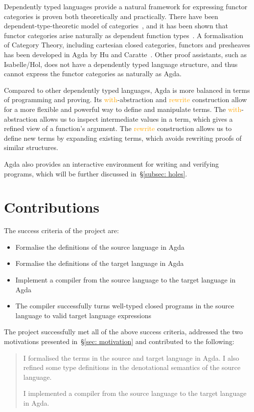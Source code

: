 \documentclass[12pt,a4paper]{report}
\theoremstyle{definition}
\newcounter{motivation}
\newcommand{\secref}[1]{\S\ref{#1}}
\newcommand{\og}[1]{\textcolor{orange}{#1}}
\begin{document}
        Dependently typed languages provide a natural framework for expressing functor categories is proven both theoretically and practically. There have been dependent-type-theoretic model of categories~\autocite{Dybjer}, and it has been shown that functor categories arise naturally as dependent function types~\autocite{Jacobs}. A formalisation of Category Theory, including cartesian closed categories, functors and presheaves has been developed in Agda by Hu and Caratte~\autocite{Cat_Agda}. Other proof assistants, such as Isabelle/Hol, does not have a dependently typed language structure, and thus cannot express the functor categories as naturally as Agda. 

        Compared to other dependently typed languages, Agda is more balanced in terms of programming and proving. Its \og{\textsf{with}}-abstraction and \og{\textsf{rewrite}} construction allow for a more flexible and powerful way to define and manipulate terms. The \og{\textsf{with}}-abstraction allows us to inspect intermediate values in a term, which gives a refined view of a function's argument. The \og{\textsf{rewrite}} construction allows us to define new terms by expanding existing terms, which avoids rewriting proofs of similar structures.

        Agda also provides an interactive environment for writing and verifying programs, which will be further discussed in~\secref{subsec: holes}.

    \section{Contributions} \label{sec: contributions}
        The success criteria of the project are:
        \begin{itemize}
            \item 
                Formalise the definitions of the source language in Agda
            \item 
                Formalise the definitions of the target language in Agda
            \item
                Implement a compiler from the source language to the target language in Agda
            \item 
                The compiler successfully turns well-typed closed programs in the source language to valid target language expressions
        \end{itemize}

        The project successfully met all of the above success criteria, addressed the two motivations presented in~\secref{sec: motivation} and contributed to the following:
        \begin{quote}            
            \savedmotivationI
            I formalised the terms in the source and target language in Agda. I also refined some type definitions in the denotational semantics of the source language.
            
            \savedmotivationII
            I implemented a compiler from the source language to the target language in Agda. 
        \end{quote}
\end{document}
